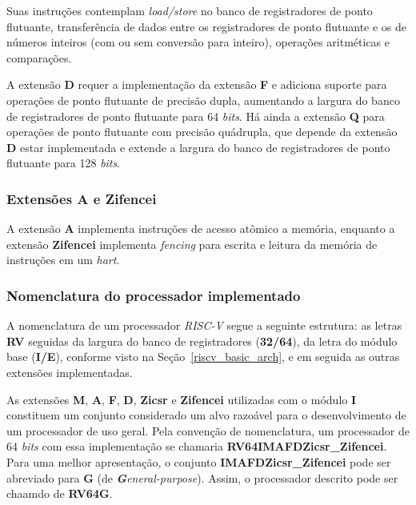         { Suas instruções contemplam \textit{load/store} no banco de registradores
            de ponto flutuante, transferência de dados entre os registradores de
            ponto flutuante e os de números inteiros (com ou sem conversão para
            inteiro), operações aritméticas e comparações.
        }

        { A extensão \textbf{D} requer a implementação da extensão \textbf{F} e
            adiciona suporte para operações de ponto flutuante de precisão dupla,
            aumentando a largura do banco de registradores de ponto flutuante
            para 64 \textit{bits}. Há ainda a extensão \textbf{Q} para operações
            de ponto flutuante com precisão quádrupla, que depende da extensão
            \textbf{D} estar implementada e extende a largura do banco de
            registradores de ponto flutuante para 128 \textit{bits}.
        }

        \subsubsection{Extensões A e Zifencei}
        { A extensão \textbf{A} implementa instruções de acesso atômico a memória,
            enquanto a extensão \textbf{Zifencei} implementa \textit{fencing}
            para escrita e leitura da memória de instruções em um \textit{hart}.
        }

        \subsubsection{Nomenclatura do processador implementado}
        { A nomenclatura de um processador \textit{RISC-V} segue a seguinte
            estrutura: as letras \textbf{RV} seguidas da largura do banco de
            registradores (\textbf{32/64}), da letra do módulo base (\textbf{I/E}),
            conforme visto na Seção~\ref{riscv_basic_arch}, e em seguida as outras
            extensões implementadas.
        }

        { As extensões \textbf{M}, \textbf{A}, \textbf{F}, \textbf{D},
            \textbf{Zicsr} e \textbf{Zifencei} utilizadas com o módulo \textbf{I}
            constituem um conjunto considerado um alvo razoável para o
            desenvolvimento de um processador de uso geral. Pela convenção de
            nomenclatura, um processador de 64 \textit{bits} com essa implementação
            se chamaria \textbf{RV64IMAFDZicsr\_Zifencei}. Para uma melhor
            apresentação, o conjunto \textbf{IMAFDZicsr\_Zifencei} pode ser abreviado
            para \textbf{G} (de \textit{\textbf{G}eneral-purpose}). Assim, o
            processador descrito pode ser chaamdo de \textbf{RV64G}.
        }

